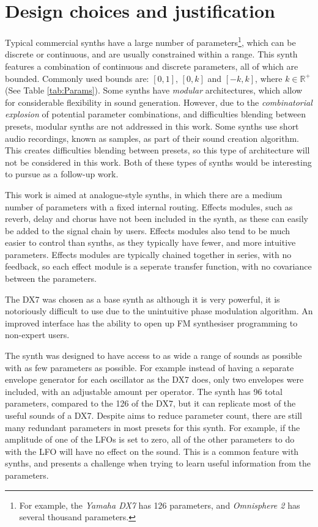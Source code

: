 \documentclass[11pt, oneside]{report}   	%
\begin{document}
\section{Design choices and justification}\label{sec:SynthDescription}
Typical commercial synths have a large number of parameters\footnote{For example, the \emph{Yamaha DX7} has 126 parameters, and  \emph{Omnisphere 2} has several thousand parameters.}, which can be discrete or continuous, and are usually constrained within a range. This synth features a combination of continuous and discrete parameters, all of which are bounded. Commonly used bounds are: $[0, 1]$, $[0, k]$ and $[-k, k]$, where $k \in \mathbb{R}^+ $ (See Table \ref{tab:Params}). 
Some synths have \emph{modular} architectures, which allow for considerable flexibility in sound generation. However, due to the \emph{combinatorial explosion} of potential parameter combinations, and difficulties blending between presets, modular synths are not addressed in this work.
Some synths use short audio recordings, known as samples, as part of their sound creation algorithm. This creates difficulties blending between presets, so this type of architecture will not be considered in this work. Both of these types of synths would be interesting to pursue as a follow-up work.

This work is aimed at analogue-style synths, in which there are a medium number of parameters with a fixed internal routing. Effects modules, such as reverb, delay and chorus have not been included in the synth, as these can easily be added to the signal chain by users. Effects modules also tend to be much easier to control than synths, as they typically have fewer, and more intuitive parameters. Effects modules are typically chained together in series, with no feedback, so each effect module is a seperate transfer function, with no covariance between the parameters.


The DX7 was chosen as a base synth as although it is very powerful, it is notoriously difficult to use due to the unintuitive phase modulation algorithm. An improved interface has the ability to open up FM synthesiser programming to non-expert users. %

The synth was designed to have access to as wide a range of sounds as possible with as few parameters as possible. For example instead of having a separate envelope generator for each oscillator as the  DX7 does, only two envelopes were included, with an adjustable amount per operator. The synth has 96 total parameters, compared to the 126 of the DX7, but it can replicate most of the useful sounds of a DX7. Despite aims to reduce parameter count, there are still many redundant parameters in most presets for this synth. For example, if the amplitude of one of the LFOs is set to zero, all of the other parameters to do with the LFO will have no effect on the sound. This is a common feature with synths, and presents a challenge when trying to learn useful information from the parameters.
\end{document}
